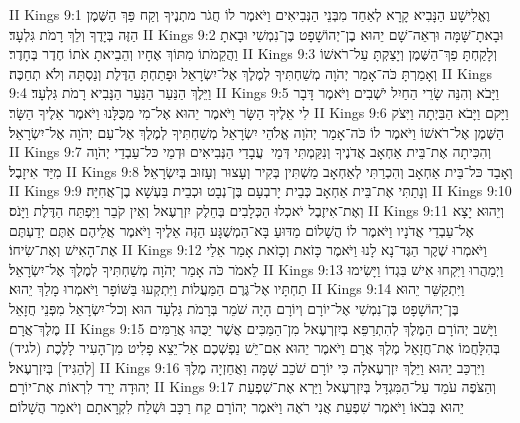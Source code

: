 II Kings 9:1	וֶאֱלִישָׁע הַנָּבִיא קָרָא לְאַחַד מִבְּנֵי הַנְּבִיאִים וַיֹּאמֶר לוֹ חֲגֹר מתְנֶיךָ וְקַח פַּךְ הַשֶּׁמֶן הַזֶּה בְּיָדֶךָ וְלֵךְ רָמֹת גִּלְעָד׃
II Kings 9:2	וּבָאתָ־שָּׁמָּה וּרְאֵה־שָׁם יֵהוּא בֶן־יְהוֹשָׁפָט בֶּן־נִמְשִׁי וּבָאתָ וַהֲקֵמֹתוֹ מִתּוֹךְ אֶחָיו וְהֵבֵיאתָ אֹתוֹ חֶדֶר בְּחָדֶר׃
II Kings 9:3	וְלָקַחְתָּ פַךְ־הַשֶּׁמֶן וְיָצַקְתָּ עַל־רֹאשׁוֹ וְאָמַרְתָּ כֹּה־אָמַר יְהֹוָה מְשַׁחְתִּיךָ לְמֶלֶךְ אֶל־יִשְׂרָאֵל וּפָתַחְתָּ הַדֶּלֶת וְנַסְתָּה וְלֹא תְחַכֶּה׃
II Kings 9:4	וַיֵּלֶךְ הַנַּעַר הַנַּעַר הַנָּבִיא רָמֹת גִּלְעָד׃
II Kings 9:5	וַיָּבֹא וְהִנֵּה שָׂרֵי הַחַיִל יֹשְׁבִים וַיֹּאמֶר דָּבָר לִי אֵלֶיךָ הַשָּׂר וַיֹּאמֶר יֵהוּא אֶל־מִי מִכֻּלָּנוּ וַיֹּאמֶר אֵלֶיךָ הַשָּׂר׃
II Kings 9:6	וַיָּקם וַיָּבֹא הַבַּיְתָה וַיִּצֹק הַשֶּׁמֶן אֶל־רֹאשׁוֹ וַיֹּאמֶר לוֹ כֹּה־אָמַר יְהֹוָה אֱלֹהֵי יִשְׂרָאֵל מְשַׁחְתִּיךָ לְמֶלֶךְ אֶל־עַם יְהֹוָה אֶל־יִשְׂרָאֵל׃
II Kings 9:7	וְהִכִּיתָה אֶת־בֵּית אַחְאָב אֲדֹנֶיךָ וְנִקַּמְתִּי דְּמֵי  עֲבָדַי הַנְּבִיאִים וּדְמֵי כּל־עַבְדֵי יְהֹוָה מִיַּד אִיזָבֶל׃
II Kings 9:8	וְאָבַד כּל־בֵּית אַחְאָב וְהִכְרַתִּי לְאַחְאָב מַשְׁתִּין בְּקִיר וְעָצוּר וְעָזוּב בְּיִשְׂרָאֵל׃
II Kings 9:9	וְנָתַתִּי אֶת־בֵּית אַחְאָב כְּבֵית יָרבְעָם בֶּן־נְבָט וּכְבֵית בַּעְשָׁא בֶן־אֲחִיָּה׃
II Kings 9:10	וְאֶת־אִיזֶבֶל יֹאכְלוּ הַכְּלָבִים בְּחֵלֶק יִזְרְעֶאל וְאֵין קֹבֵר וַיִּפְתַּח הַדֶּלֶת וַיָּנֹס׃
II Kings 9:11	וְיֵהוּא יָצָא אֶל־עַבְדֵי אֲדֹנָיו וַיֹּאמֶר לוֹ הֲשָׁלוֹם מַדּוּעַ בָּא־הַמְשֻׁגָּע הַזֶּה אֵלֶיךָ וַיֹּאמֶר אֲלֵיהֶם אַתֶּם יְדַעְתֶּם אֶת־הָאִישׁ וְאֶת־שִׂיחוֹ׃
II Kings 9:12	וַיֹּאמְרוּ שֶׁקֶר הַגֶּד־נָא לָנוּ וַיֹּאמֶר כָּזֹאת וְכָזֹאת אָמַר אֵלַי לֵאמֹר כֹּה אָמַר יְהֹוָה מְשַׁחְתִּיךָ לְמֶלֶךְ אֶל־יִשְׂרָאֵל׃
II Kings 9:13	וַיְמַהֲרוּ וַיִּקְחוּ אִישׁ בִּגְדוֹ וַיָּשִׂימוּ תַחְתָּיו אֶל־גֶּרֶם הַמַּעֲלוֹת וַיִּתְקְעוּ בַּשּׁוֹפָר וַיֹּאמְרוּ מָלַךְ יֵהוּא׃
II Kings 9:14	וַיִּתְקַשֵּׁר יֵהוּא בֶּן־יְהוֹשָׁפָט בֶּן־נִמְשִׁי אֶל־יוֹרָם וְיוֹרָם הָיָה שֹׁמֵר בְּרָמֹת גִּלְעָד הוּא וְכל־יִשְׂרָאֵל מִפְּנֵי חֲזָאֵל מֶלֶךְ־אֲרָם׃
II Kings 9:15	וַיָּשׁב יְהוֹרָם הַמֶּלֶךְ לְהִתְרַפֵּא בְיִזְרְעֶאל מִן־הַמַּכִּים אֲשֶׁר יַכֻּהוּ אֲרַמִּים בְּהִלָּחֲמוֹ אֶת־חֲזָאֵל מֶלֶךְ אֲרָם וַיֹּאמֶר יֵהוּא אִם־יֵשׁ נַפְשְׁכֶם אַל־יֵצֵא פָלִיט מִן־הָעִיר לָלֶכֶת (לגיד) [לְהַגִּיד] בְּיִזְרְעֶאל׃
II Kings 9:16	וַיִּרְכַּב יֵהוּא וַיֵּלֶךְ יִזְרְעֶאלָה כִּי יוֹרָם שֹׁכֵב שָׁמָּה וַאֲחַזְיָה מֶלֶךְ יְהוּדָה יָרַד לִרְאוֹת אֶת־יוֹרָם׃
II Kings 9:17	וְהַצֹּפֶה עֹמֵד עַל־הַמִּגְדָּל בְּיִזְרְעֶאל וַיַּרְא אֶת־שִׁפְעַת יֵהוּא בְּבֹאוֹ וַיֹּאמֶר שִׁפְעַת אֲנִי רֹאֶה וַיֹּאמֶר יְהוֹרָם קַח רַכָּב וּשְׁלַח לִקְרָאתָם וְיֹאמַר הֲשָׁלוֹם׃
